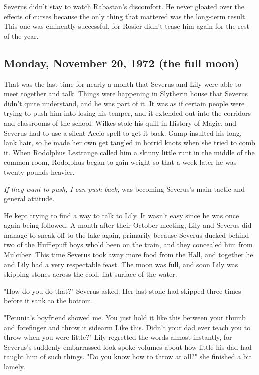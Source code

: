 Severus didn't stay to watch Rabastan's discomfort. He never gloated over the effects of curses because the only thing that mattered was the long-term result. This one was eminently successful, for Rosier didn't tease him again for the rest of the year.

\subsection{Monday, November 20, 1972 (the full moon)}

That was the last time for nearly a month that Severus and Lily were able to meet together and talk. Things were happening in Slytherin house that Severus didn't quite understand, and he was part of it. It was as if certain people were trying to push him into losing his temper, and it extended out into the corridors and classrooms of the school. Wilkes stole his quill in History of Magic, and Severus had to use a silent Accio spell to get it back. Gamp insulted his long, lank hair, so he made her own get tangled in horrid knots when she tried to comb it. When Rodolphus Lestrange called him a skinny little runt in the middle of the common room, Rodolphus began to gain weight so that a week later he was twenty pounds heavier.

\emph{If they want to push, I can push back,} was becoming Severus's main tactic and general attitude.

He kept trying to find a way to talk to Lily. It wasn't easy since he was once again being followed. A month after their October meeting, Lily and Severus did manage to sneak off to the lake again, primarily because Severus ducked behind two of the Hufflepuff boys who'd been on the train, and they concealed him from Mulciber. This time Severus took away more food from the Hall, and together he and Lily had a very respectable feast. The moon was full, and soon Lily was skipping stones across the cold, flat surface of the water.

"How do you do that?" Severus asked. Her last stone had skipped three times before it sank to the bottom.

"Petunia's boyfriend showed me. You just hold it like this between your thumb and forefinger and throw it sidearm{\el} Like this. Didn't your dad ever teach you to throw when you were little?" Lily regretted the words almost instantly, for Severus's suddenly embarrassed look spoke volumes about how little his dad had taught him of such things. "Do you know how to throw at all?" she finished a bit lamely.


